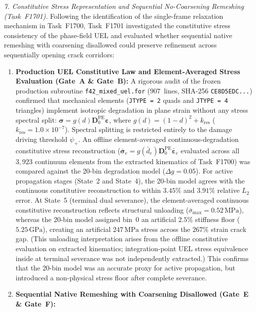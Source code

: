 \textit{7. Constitutive Stress Representation and Sequential No-Coarsening Remeshing (Task~F1701).}
Following the identification of the single-frame relaxation mechanism in Task~F1700, Task~F1701 investigated the constitutive stress consistency of the phase-field UEL and evaluated whether sequential native remeshing with coarsening disallowed could preserve refinement across sequentially opening crack corridors:
\begin{enumerate}
  \item \textbf{Production UEL Constitutive Law and Element-Averaged Stress Evaluation (Gate~A \& Gate~B):}
  A rigorous audit of the frozen production subroutine \texttt{f42\_mixed\_uel.for} ($907$~lines, SHA-256 \texttt{CE8D5EDC...}) confirmed that mechanical elements (\texttt{JTYPE = 2} quads and \texttt{JTYPE = 4} triangles) implement isotropic degradation in plane strain without any stress spectral split: $\boldsymbol{\sigma} = g(d) \mathbf{D}_0^{\mathrm{PE}} \boldsymbol{\varepsilon}$, where $g(d) = (1-d)^2 + k_{\mathrm{res}}$ ($k_{\mathrm{res}} = 1.0 \times 10^{-7}$). Spectral splitting is restricted entirely to the damage driving threshold $\psi_+$.
  An offline element-averaged continuous-degradation constitutive stress reconstruction ($\bar{\boldsymbol{\sigma}}_e = g(\bar{d}_e) \mathbf{D}_0^{\mathrm{PE}} \bar{\boldsymbol{\varepsilon}}_e$ evaluated across all $3{,}923$ continuum elements from the extracted kinematics of Task~F1700) was compared against the 20-bin degradation model ($\Delta g = 0.05$). For active propagation stages (State~2 and State~4), the 20-bin model agrees with the continuous constitutive reconstruction to within $3.45\%$ and $3.91\%$ relative $L_2$ error. At State~5 (terminal dual severance), the element-averaged continuous constitutive reconstruction reflects structural unloading ($\bar{\sigma}_{\max} = 0.52\,\mathrm{MPa}$), whereas the 20-bin model assigned bin~0 an artificial $2.5\%$ stiffness floor ($5.25\,\mathrm{GPa}$), creating an artificial $247\,\mathrm{MPa}$ stress across the $267\%$ strain crack gap. (This unloading interpretation arises from the offline constitutive evaluation on extracted kinematics; integration-point UEL stress equivalence inside \Abaqus at terminal severance was not independently extracted.) This confirms that the 20-bin model was an accurate proxy for active propagation, but introduced a non-physical stress floor after complete severance.
  \item \textbf{Sequential Native Remeshing with Coarsening Disallowed (Gate~E \& Gate~F):}

\end{enumerate}
